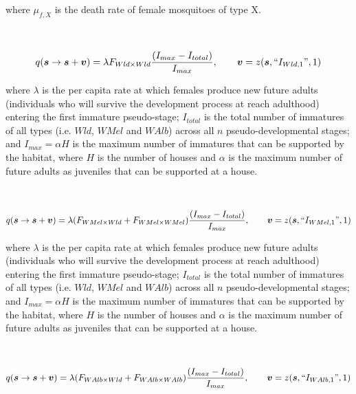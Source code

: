 \documentclass[]{article}  %
\begin{document}
\noindent where $\mu_{f,X}$ is the death rate of female mosquitoes of type X.
\\
\\
\\
$$q(\boldsymbol{s} \rightarrow \boldsymbol{s} + \boldsymbol{v}) = \lambda F_{Wld \times Wld}\frac{(I_{max} - I_{total})}{I_{max}},  \qquad \boldsymbol{v} =  z(\boldsymbol{s}, \textup{``} I_{Wld, 1} \textup{''} , 1)$$

\noindent where $\lambda$ is the per capita rate at which females produce new future adults (individuals who will survive the development process at reach adulthood) entering the first immature pseudo-stage; $I_{total}$ is the total number of immatures of all types (i.e. $Wld$, $WMel$ and $WAlb$) across all $n$ pseudo-developmental stages; and $I_{max} = \alpha H$ is the maximum number of immatures that can be supported by the habitat, where $H$ is the number of houses and $\alpha$ is the maximum number of future adults as juveniles that can be supported at a house.
\\
\\
\\
$$q(\boldsymbol{s} \rightarrow \boldsymbol{s} + \boldsymbol{v}) = \lambda (F_{WMel \times Wld} + F_{WMel \times WMel})\frac{(I_{max} - I_{total})}{I_{max}},  \qquad \boldsymbol{v} =  z(\boldsymbol{s}, \textup{``} I_{WMel, 1} \textup{''} , 1)$$

\noindent where $\lambda$ is the per capita rate at which females produce new future adults (individuals who will survive the development process at reach adulthood) entering the first immature pseudo-stage; $I_{total}$ is the total number of immatures of all types (i.e. $Wld$, $WMel$ and $WAlb$) across all $n$ pseudo-developmental stages; and $I_{max} = \alpha H$ is the maximum number of immatures that can be supported by the habitat, where $H$ is the number of houses and $\alpha$ is the maximum number of future adults as juveniles that can be supported at a house.
\\
\\
\\

$$q(\boldsymbol{s} \rightarrow \boldsymbol{s} + \boldsymbol{v}) = \lambda (F_{WAlb \times Wld} + F_{WAlb \times WAlb})\frac{(I_{max} - I_{total})}{I_{max}},  \qquad \boldsymbol{v} =  z(\boldsymbol{s}, \textup{``} I_{WAlb, 1} \textup{''} , 1)$$
\end{document}
